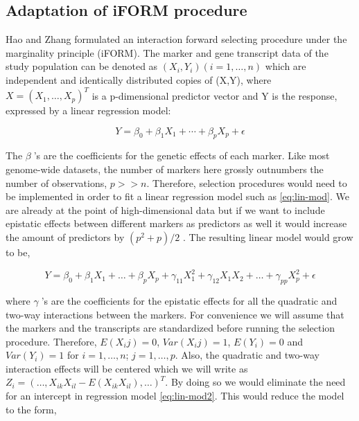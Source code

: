 \documentclass[11pt,]{book}
\theoremstyle{definition}
\theoremstyle{definition}
\theoremstyle{remark}
\begin{document}
\subsection{Adaptation of iFORM
procedure}\label{adaptation-of-iform-procedure}

Hao and Zhang \cite{hao2014interaction} formulated an interaction
forward selecting procedure under the marginality principle (iFORM). The
marker and gene transcript data of the study population can be denoted
as \((X_i,Y_i) (i = 1,\dots, n)\) which are independent and identically
distributed copies of (X,Y), where \(X = (X_1,\dots,X_p )^T\) is a
p-dimensional predictor vector and Y is the response, expressed by a
linear regression model:

\begin{equation}
Y = \beta_0 + \beta_1 X_1 + ⋯ + \beta_p X_p + \epsilon
\label{eq:lin-mod}
\end{equation}

The \(\beta\)'s are the coefficients for the genetic effects of each
marker. Like most genome-wide datasets, the number of markers here
grossly outnumbers the number of observations, \(p >> n\). Therefore,
selection procedures would need to be implemented in order to fit a
linear regression model such as \eqref{eq:lin-mod}. We are already at the
point of high-dimensional data but if we want to include epistatic
effects between different markers as predictors as well it would
increase the amount of predictors by \((p^2+p)/2\) . The resulting
linear model would grow to be,

\begin{equation}
Y = \beta_0 + \beta_1 X_1 + \dots + \beta_p X_p + \gamma_{11} X_1^2 +\gamma_{12} {X_1}{X_2} + \dots + \gamma_{pp} X_p^2 + \epsilon
\label{eq:lin-mod2}
\end{equation}

where \(\gamma\)'s are the coefficients for the epistatic effects for
all the quadratic and two-way interactions between the markers. For
convenience we will assume that the markers and the transcripts are
standardized before running the selection procedure. Therefore,
\(E(X_ij )=0\), \(Var(X_ij )=1\), \(E(Y_i )=0\) and \(Var(Y_i )=1\) for
\(i=1,\dots,n\); \(j=1,\dots,p\). Also, the quadratic and two-way
interaction effects will be centered which we will write as
\(Z_i=(\dots,X_{ik} X_{il}-E(X_{ik} X_{il} ),\dots)^T\). By doing so we
would eliminate the need for an intercept in regression model
\eqref{eq:lin-mod2}. This would reduce the model to the form,
\end{document}
